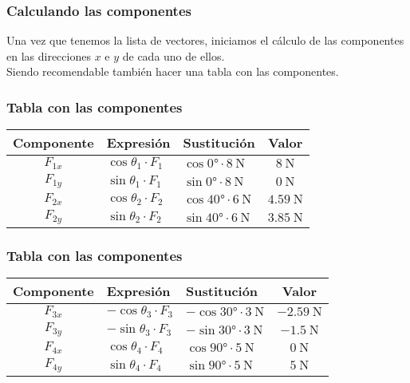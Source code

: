 \documentclass[12pt]{beamer}
\begin{document}
\begin{frame}
\frametitle{Calculando las componentes}
Una vez que tenemos la lista de vectores, iniciamos el cálculo de las componentes en las direcciones $x$ e $y$ de cada uno de ellos.
\\
\bigskip
\pause
Siendo recomendable también hacer una tabla con las componentes.
\end{frame}
\begin{frame}
\frametitle{Tabla con las componentes}
\begin{table}
\centering
\begin{tabular}{c | l | l | c}
Componente & Expresión & Sustitución & Valor \\ \hline
$F_{1x}$ & $\cos \theta_{1} \cdot F_{1}$ & $\cos \ang{0} \cdot \SI{8}{\newton}$ & $\SI{8}{\newton}$ \\ \hline
$F_{1y}$ & $\sin \theta_{1} \cdot F_{1}$ & $\sin \ang{0} \cdot \SI{8}{\newton}$ & $\SI{0}{\newton}$ \\ \hline
$F_{2x}$ & $\cos \theta_{2} \cdot F_{2}$ & $\cos \ang{40} \cdot \SI{6}{\newton}$ & $\SI{4.59}{\newton}$ \\ \hline
$F_{2y}$ & $\sin \theta_{2} \cdot F_{2}$ & $\sin \ang{40} \cdot \SI{6}{\newton}$ & $\SI{3.85}{\newton}$ \\ \hline
\end{tabular}
\end{table}
\end{frame}
\begin{frame}
\frametitle{Tabla con las componentes}
\begin{table}
\centering
\begin{tabular}{c | l | l | c}
Componente & Expresión & Sustitución & Valor \\ \hline
$F_{3x}$ & $-\cos \theta_{3} \cdot F_{3}$ & $-\cos \ang{30} \cdot \SI{3}{\newton}$ & $-\SI{2.59}{\newton}$ \\ \hline
$F_{3y}$ & $-\sin \theta_{3} \cdot F_{3}$ & $-\sin \ang{30} \cdot \SI{3}{\newton}$ & $-\SI{1.5}{\newton}$ \\ \hline
$F_{4x}$ & $\cos \theta_{4} \cdot F_{4}$ & $\cos \ang{90} \cdot \SI{5}{\newton}$ & $\SI{0}{\newton}$ \\ \hline
$F_{4y}$ & $\sin \theta_{4} \cdot F_{4}$ & $\sin \ang{90} \cdot \SI{5}{\newton}$ & $\SI{5}{\newton}$ \\ \hline
\end{tabular}
\end{table}
\end{frame}
\end{document}
